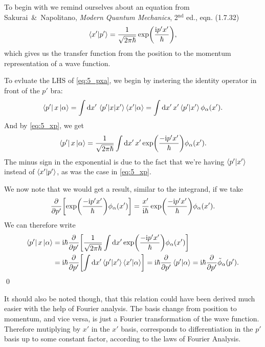 \documentclass[11pt,letter, swedish, english
]{article}
\begin{document}
To begin with we remind ourselves about an equation from
Sakurai~\&~Napolitano, \textit{Modern Quantum Mechanics},
2$^\text{nd}$ ed., eqn. (1.7.32)
\begin{equation}\label{eq:5_xp}
\braket{x'}{p'} = \frac{1}{\sqrt{2\pi\hbar}} \exp(\frac{\mathrm{i} p'x'}{\hbar}),
\end{equation}
which gives us the transfer function from the position to the momentum
representation of a wave function.

To evluate the LHS of \eqref{eq:5_pxa}, we begin by instering the
identity operator in front of the $p'$ bra:
\begin{equation}
\bra{p'}x\ket{\alpha} = \int\dd{x'}\mel{p'}{x}{x'}\braket{x'}{\alpha}
= \int\dd{x'} x'\braket{p'}{x'}\phi_\alpha(x').
\end{equation}
And by \eqref{eq:5_xp}, we get
\begin{equation}
\bra{p'}x\ket{\alpha} = \frac{1}{\sqrt{2\pi\hbar}} 
  \int\dd{x'} x'\exp(\frac{-\ii p'x'}{\hbar}) \phi_\alpha(x').
\end{equation}
The minus sign in the exponential is due to the fact that we're having
$\braket{p'}{x'}$ instead of $\braket{x'}{p'}$, as was the case in
\eqref{eq:5_xp}. 

We now note that we would get a result, similar to the integrand, if
we take
\begin{equation}
\pdv{p'}\qty[\exp(\frac{-\mathrm{i} p'x'}{\hbar}) \phi_\alpha(x')]
=\frac{x'}{\mathrm{i}\hbar}\exp(\frac{-\mathrm{i} p'x'}{\hbar}) \phi_\alpha(x').
\end{equation}
We can therefore\footnotemark{} write
\begin{equation}
\begin{aligned}
\bra{p'}x\ket{\alpha} &= \ii\hbar \pdv{p'}\qty[
 \frac{1}{\sqrt{2\pi\hbar}} 
  \int\dd{x'} \exp(\frac{-\ii p'x'}{\hbar}) \phi_\alpha(x')]\\
&= \ii\hbar \pdv{p'}\qty[
   \int\dd{x'}\braket{p'}{x'}\braket{x'}{\alpha}] 
= \ii\hbar\pdv{p'}\braket{p'}{\alpha}
= \ii\hbar\pdv{p'}\tilde\phi_\alpha(p').
\end{aligned}
\end{equation}
\qed
{}

It should also be noted though, that this relation could have been
derived much easier with the help of Fourier analysis. The basis
change from position to momentum, and vice versa, is just a Fourier
transformation of the wave function. Therefore mutiplying by $x'$ in
the $x'$ basis, corresponds to differentiation in the $p'$ basis up to
some constant factor, according to the laws of Fourier Analysis. 
\end{document}
